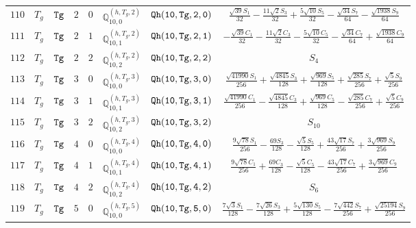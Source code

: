 \documentclass[fleqn,8pt]{jsarticle}
\begin{document}
\begin{table}[ht!]
\begin{center}
\begin{tabular}{cccccccc}
$ 110 $ & $ T_{g} $ & $ {\tt Tg} $ & $ 2 $ & $ 0 $ & $ \mathbb{Q}_{10,0}^{(h,T_{g},2)} $ & $ {\tt Qh(10,Tg,2,0)} $ & $ \frac{\sqrt{39} S_{1}}{32} - \frac{11 \sqrt{2} S_{3}}{32} + \frac{5 \sqrt{10} S_{5}}{32} - \frac{\sqrt{34} S_{7}}{64} - \frac{\sqrt{1938} S_{9}}{64} $ \\
$ 111 $ & $ T_{g} $ & $ {\tt Tg} $ & $ 2 $ & $ 1 $ & $ \mathbb{Q}_{10,1}^{(h,T_{g},2)} $ & $ {\tt Qh(10,Tg,2,1)} $ & $ - \frac{\sqrt{39} C_{1}}{32} - \frac{11 \sqrt{2} C_{3}}{32} - \frac{5 \sqrt{10} C_{5}}{32} - \frac{\sqrt{34} C_{7}}{64} + \frac{\sqrt{1938} C_{9}}{64} $ \\
$ 112 $ & $ T_{g} $ & $ {\tt Tg} $ & $ 2 $ & $ 2 $ & $ \mathbb{Q}_{10,2}^{(h,T_{g},2)} $ & $ {\tt Qh(10,Tg,2,2)} $ & $ S_{4} $ \\
$ 113 $ & $ T_{g} $ & $ {\tt Tg} $ & $ 3 $ & $ 0 $ & $ \mathbb{Q}_{10,0}^{(h,T_{g},3)} $ & $ {\tt Qh(10,Tg,3,0)} $ & $ \frac{\sqrt{41990} S_{1}}{256} + \frac{\sqrt{4845} S_{3}}{128} + \frac{\sqrt{969} S_{5}}{128} + \frac{\sqrt{285} S_{7}}{256} + \frac{\sqrt{5} S_{9}}{256} $ \\
$ 114 $ & $ T_{g} $ & $ {\tt Tg} $ & $ 3 $ & $ 1 $ & $ \mathbb{Q}_{10,1}^{(h,T_{g},3)} $ & $ {\tt Qh(10,Tg,3,1)} $ & $ \frac{\sqrt{41990} C_{1}}{256} - \frac{\sqrt{4845} C_{3}}{128} + \frac{\sqrt{969} C_{5}}{128} - \frac{\sqrt{285} C_{7}}{256} + \frac{\sqrt{5} C_{9}}{256} $ \\
$ 115 $ & $ T_{g} $ & $ {\tt Tg} $ & $ 3 $ & $ 2 $ & $ \mathbb{Q}_{10,2}^{(h,T_{g},3)} $ & $ {\tt Qh(10,Tg,3,2)} $ & $ S_{10} $ \\
$ 116 $ & $ T_{g} $ & $ {\tt Tg} $ & $ 4 $ & $ 0 $ & $ \mathbb{Q}_{10,0}^{(h,T_{g},4)} $ & $ {\tt Qh(10,Tg,4,0)} $ & $ \frac{9 \sqrt{78} S_{1}}{256} - \frac{69 S_{3}}{128} - \frac{\sqrt{5} S_{5}}{128} + \frac{43 \sqrt{17} S_{7}}{256} + \frac{3 \sqrt{969} S_{9}}{256} $ \\
$ 117 $ & $ T_{g} $ & $ {\tt Tg} $ & $ 4 $ & $ 1 $ & $ \mathbb{Q}_{10,1}^{(h,T_{g},4)} $ & $ {\tt Qh(10,Tg,4,1)} $ & $ \frac{9 \sqrt{78} C_{1}}{256} + \frac{69 C_{3}}{128} - \frac{\sqrt{5} C_{5}}{128} - \frac{43 \sqrt{17} C_{7}}{256} + \frac{3 \sqrt{969} C_{9}}{256} $ \\
$ 118 $ & $ T_{g} $ & $ {\tt Tg} $ & $ 4 $ & $ 2 $ & $ \mathbb{Q}_{10,2}^{(h,T_{g},4)} $ & $ {\tt Qh(10,Tg,4,2)} $ & $ S_{6} $ \\
$ 119 $ & $ T_{g} $ & $ {\tt Tg} $ & $ 5 $ & $ 0 $ & $ \mathbb{Q}_{10,0}^{(h,T_{g},5)} $ & $ {\tt Qh(10,Tg,5,0)} $ & $ \frac{7 \sqrt{3} S_{1}}{128} - \frac{7 \sqrt{26} S_{3}}{128} + \frac{5 \sqrt{130} S_{5}}{128} - \frac{7 \sqrt{442} S_{7}}{256} + \frac{\sqrt{25194} S_{9}}{256} $ \\

\end{tabular}
\end{center}
\end{table}
\end{document}
